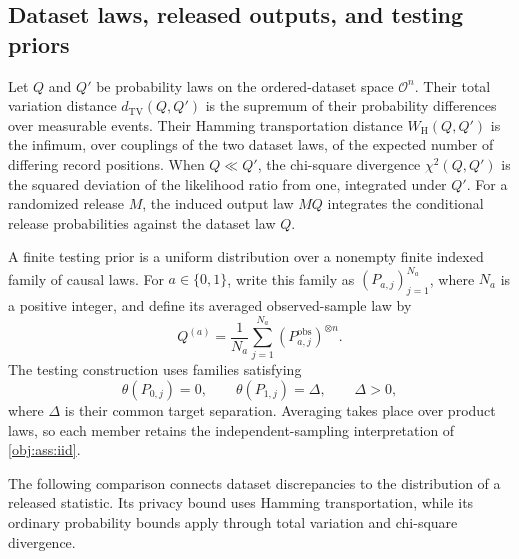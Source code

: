 \documentclass[11pt]{article}
\begin{document}
\subsection{Dataset laws, released outputs, and testing priors}

Let \(Q\) and \(Q'\) be probability laws on the ordered-dataset space \(\mathcal O^n\). Their total variation distance \(d_{\mathrm{TV}}(Q,Q')\) is the supremum of their probability differences over measurable events. Their Hamming transportation distance \(W_{\mathrm H}(Q,Q')\) is the infimum, over couplings of the two dataset laws, of the expected number of differing record positions. When \(Q\ll Q'\), the chi-square divergence \(\chi^2(Q,Q')\) is the squared deviation of the likelihood ratio from one, integrated under \(Q'\). For a randomized release \(M\), the induced output law \(MQ\) integrates the conditional release probabilities against the dataset law \(Q\).

A finite testing prior is a uniform distribution over a nonempty finite indexed family of causal laws. For \(a\in\{0,1\}\), write this family as \((P_{a,j})_{j=1}^{N_a}\), where \(N_a\) is a positive integer, and define its averaged observed-sample law by
\[
Q^{(a)}
=
\frac{1}{N_a}\sum_{j=1}^{N_a}
(P_{a,j}^{\mathrm{obs}})^{\otimes n}.
\]
The testing construction uses families satisfying
\[
\theta(P_{0,j})=0,
\qquad
\theta(P_{1,j})=\Delta,
\qquad
\Delta>0,
\]
where \(\Delta\) is their common target separation. Averaging takes place over product laws, so each member retains the independent-sampling interpretation of \cref{obj:ass:iid}.

The following comparison connects dataset discrepancies to the distribution of a released statistic. Its privacy bound uses Hamming transportation, while its ordinary probability bounds apply through total variation and chi-square divergence.
\end{document}
